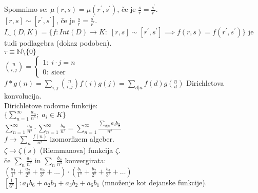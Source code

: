 \documentclass[a4paper, 12pt]{book}
\theoremstyle{definition}
\theoremstyle{remark}
\newcommand{\N}{\mathbb{N}}
\begin{document}
Spomnimo se: $\mu(r, s) = \mu(r^{'}, s^{'})$, če je $\frac{s}{r} = \frac{s^{'}}{r^{'}}$. \\
$[r, s] \sim [r^{'}, s^{'}]$, če je $\frac{s}{r} = \frac{s^{'}}{r^{'}}$. \\
$I_{\sim}(D, K) = \{f: Int(D) \to K: \; [r,s] \sim [r^{'}, s^{'}] \implies f(r, s) = f(r^{'}, s^{'})\}$
je tudi podlagebra (dokaz podoben). \\
$\tau \equiv \N \setminus \{0\}$ \\
$\binom{n}{i,j} = \begin{cases}
  1: \; i \cdot j = n \\
  0: \; \text{sicer}
\end{cases}$ \\
$f * g(n) = \sum_{i,j} \binom{n}{i,j} f(i) g(j) = \sum_{d | n} f(d) g\left(\frac{n}{d}\right)$
Dirichletova konvolucija. \\
Dirichletove rodovne funkcije: \\
$\{\sum_{n=1}^{\infty} \frac{a_n}{n^s}; \; a_i \in K\}$ \\
$\sum_{n=1}^{\infty} \frac{a_n}{n^s} \cdot \sum_{n=1}^{\infty} \frac{b_n}{n^s}
= \sum_{n=1}^{\infty} \frac{\sum_{d | n} a_d b_{\frac{n}{d}}}{n^s}$ \\
$f \to \sum_n \frac{f(n)}{n^s}$ izomorfizem algeber. \\
$\zeta \to \zeta(s)$ (Riemmanova) funkcija $\zeta$. \\
če $\sum_n \frac{a_n}{n^s}$ in $\sum_n \frac{b_n}{n^s}$ konvergirata: \\
$\left(\frac{a_1}{1^s} + \frac{a_2}{2^s} + \frac{a_3}{3^s} + \dots\right) \cdot
\left(\frac{b_1}{1^s} + \frac{b_2}{2^s} + \frac{b_3}{3^s} + \dots\right)$ \\
$\left[\frac{1}{6^s}\right]: a_1 b_6 + a_2 b_3 + a_3 b_2 + a_6 b_1$ (množenje kot dejanske funkcije).


\end{document}
